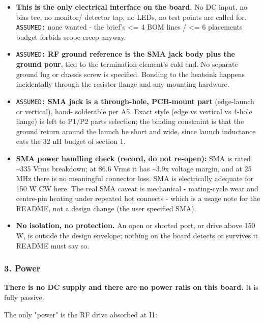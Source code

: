 \documentclass[11pt,a4paper]{article}
\begin{document}
\begin{itemize}
\item \textbf{This is the only electrical interface on the board.} No DC input, no bias tee, no monitor/
detector tap, no LEDs, no test points are called for. \texttt{ASSUMED:} none wanted - the brief's
\textless{}= 4 BOM lines / \textless{}= 6 placements budget forbids scope creep anyway.
\item \texttt{ASSUMED:} \textbf{RF ground reference is the SMA jack body plus the ground pour}, tied to the
termination element's cold end. No separate ground lug or chassis screw is specified. Bonding
to the heatsink happens incidentally through the resistor flange and any mounting hardware.
\item \texttt{ASSUMED:} \textbf{SMA jack is a through-hole, PCB-mount part} (edge-launch or vertical), hand-
solderable per A5. Exact style (edge vs vertical vs 4-hole flange) is left to P1/P2 parts
selection; the binding constraint is that the ground return around the launch be short and
wide, since launch inductance eats the 32 nH budget of section 1.
\item \textbf{SMA power handling check (record, do not re-open):} SMA is rated \textasciitilde{}335 Vrms breakdown; at
86.6 Vrms it has \textasciitilde{}3.9x voltage margin, and at 25 MHz there is no meaningful connector loss.
SMA is electrically adequate for 150 W CW here. The real SMA caveat is mechanical - mating-cycle
wear and centre-pin heating under repeated hot connects - which is a usage note for the README,
not a design change (the user specified SMA).
\item \textbf{No isolation, no protection.} An open or shorted port, or drive above 150 W, is outside the
design envelope; nothing on the board detects or survives it. README must say so.
\end{itemize}
\subsubsection*{3. Power}
\textbf{There is no DC supply and there are no power rails on this board.} It is fully passive.

The only "power" is the RF drive absorbed at I1:
\end{document}
